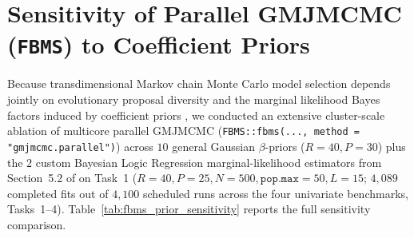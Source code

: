 \documentclass[11pt,a4paper]{article}
\begin{document}
\section{Sensitivity of Parallel GMJMCMC (\texttt{FBMS}) to Coefficient Priors}
\label{app:fbms_priors}

Because transdimensional Markov chain Monte Carlo model selection depends jointly on evolutionary proposal diversity and the marginal likelihood Bayes factors induced by coefficient priors \citep{frommlet2025fbms}, we conducted an extensive cluster-scale ablation of multicore parallel GMJMCMC (\texttt{FBMS::fbms(..., method = "gmjmcmc.parallel")}) across $10$ general Gaussian $\beta$-priors ($R = 40, P = 30$) plus the $2$ custom Bayesian Logic Regression marginal-likelihood estimators from Section~5.2 of \citet{frommlet2025fbms} on Task~1 ($R = 40, P = 25, N = 500, \texttt{pop.max} = 50, L = 15$; $4{,}089$ completed fits out of $4{,}100$ scheduled runs across the four univariate benchmarks, Tasks~1--4). Table~\ref{tab:fbms_prior_sensitivity} reports the full sensitivity comparison.
\end{document}
